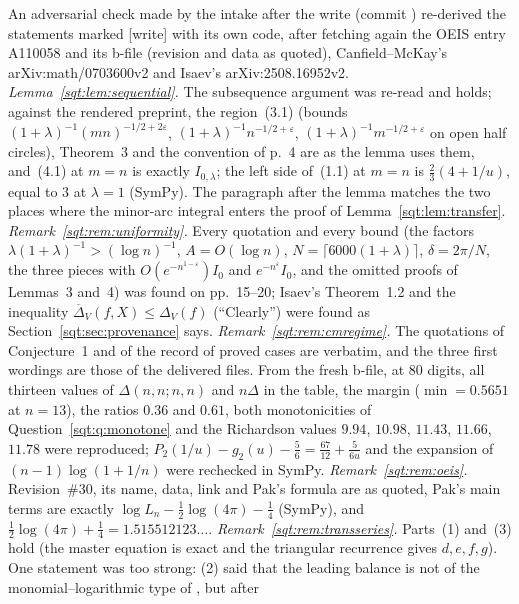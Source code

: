 \begin{writenote}
An adversarial check made by the intake after the write (commit
) re-derived the statements marked [write] with its own
code, after fetching again the OEIS entry A110058 and its b-file (revision
and data as quoted), Canfield--McKay's arXiv:math/0703600v2 and Isaev's
arXiv:2508.16952v2. \emph{Lemma~\ref{sqt:lem:sequential}.} The subsequence
argument was re-read and holds; against the rendered preprint, the region~(3.1)
(bounds $(1+\lambda)^{-1}(mn)^{-1/2+2\varepsilon}$,
$(1+\lambda)^{-1}n^{-1/2+\varepsilon}$, $(1+\lambda)^{-1}m^{-1/2+\varepsilon}$
on open half circles), Theorem~3 and the convention of p.~4 are as the
lemma uses them, and~(4.1) at $m=n$ is exactly $I_{0,\lambda}$; the left side
of~(1.1) at $m=n$ is $\tfrac23(4+1/u)$, equal to $3$ at $\lambda=1$ (SymPy).
The paragraph after the lemma matches the two places where the minor-arc
integral enters the proof of Lemma~\ref{sqt:lem:transfer}.
\emph{Remark~\ref{sqt:rem:uniformity}.} Every quotation and every bound
(the factors $\lambda(1+\lambda)^{-1}>(\log n)^{-1}$, $A=O(\log n)$,
$N=\lceil6000(1+\lambda)\rceil$, $\delta=2\pi/N$, the three pieces with
$O(e^{-n^{1-\varepsilon}})I_0$ and $e^{-n^\varepsilon}I_0$, and the omitted
proofs of Lemmas~3 and~4) was found on pp.~15--20; Isaev's Theorem~1.2 and
the inequality $\overline\Delta_V(f,X)\le\Delta_V(f)$ (``Clearly'') were
found as Section~\ref{sqt:sec:provenance} says.
\emph{Remark~\ref{sqt:rem:cmregime}.} The quotations of Conjecture~1 and of
the record of proved cases are verbatim, and the three first wordings are
those of the delivered files. From the fresh b-file, at $80$ digits, all
thirteen values of $\Delta(n,n;n,n)$ and $n\Delta$ in the table, the margin
($\min=0.5651$ at $n=13$), the ratios $0.36$ and $0.61$, both
monotonicities of Question~\ref{sqt:q:monotone} and the Richardson values
$9.94$, $10.98$, $11.43$, $11.66$, $11.78$ were reproduced;
$P_2(1/u)-g_2(u)-\tfrac56=\tfrac{67}{12}+\tfrac5{6u}$ and the expansion of
$(n-1)\log(1+1/n)$ were rechecked in SymPy.
\emph{Remark~\ref{sqt:rem:oeis}.} Revision~\#30, its name, data, link and
Pak's formula are as quoted, Pak's main terms are exactly
$\log L_n-\tfrac12\log(4\pi)-\tfrac14$ (SymPy), and
$\tfrac12\log(4\pi)+\tfrac14=1.515512123\ldots$.
\emph{Remark~\ref{sqt:rem:transseries}.} Parts~(1) and~(3) hold (the master
equation is exact and the triangular recurrence gives $d,e,f,g$). One
statement was too strong: (2) said that the leading balance is not of the
monomial--logarithmic type of , but after

\end{writenote}
